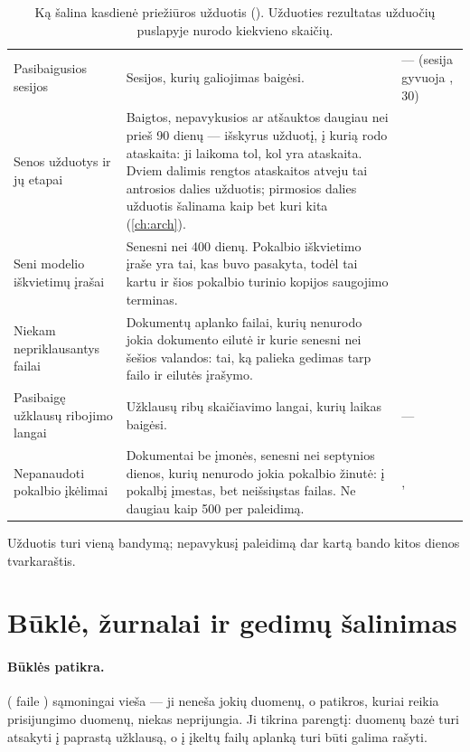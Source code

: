 \begin{table}[H]
\caption{Ką šalina kasdienė priežiūros užduotis (). Užduoties
rezultatas užduočių puslapyje nurodo kiekvieno skaičių.}\label{tab:ops:maintenance}
\begin{tabularx}{\textwidth}{@{}L{38mm}YL{45mm}@{}}
\toprule
{} &  &  \\
\midrule
Pasibaigusios sesijos & Sesijos, kurių galiojimas baigėsi. & --- (sesija gyvuoja , 30) \\
Senos užduotys ir jų etapai & Baigtos, nepavykusios ar atšauktos daugiau nei prieš 90 dienų --- išskyrus užduotį, į kurią rodo ataskaita: ji laikoma tol, kol yra ataskaita. Dviem dalimis rengtos ataskaitos atveju tai antrosios dalies užduotis; pirmosios dalies užduotis šalinama kaip bet kuri kita (\cref{ch:arch}). &  \\
Seni modelio iškvietimų įrašai & Senesni nei 400 dienų. Pokalbio iškvietimo įraše yra tai, kas buvo pasakyta, todėl tai kartu ir šios pokalbio turinio kopijos saugojimo terminas. &  \\
Niekam nepriklausantys failai &Dokumentų aplanko failai, kurių nenurodo jokia dokumento eilutė ir kurie senesni nei šešios valandos: tai, ką palieka gedimas tarp failo ir eilutės įrašymo. &  \\
Pasibaigę užklausų ribojimo langai & Užklausų ribų skaičiavimo langai, kurių laikas baigėsi. & --- \\
Nepanaudoti pokalbio įkėlimai & Dokumentai be įmonės, senesni nei septynios dienos, kurių nenurodo jokia pokalbio žinutė: į pokalbį įmestas, bet neišsiųstas failas. Ne daugiau kaip 500 per paleidimą. & ,  \\
\bottomrule
\end{tabularx}
\end{table}

Užduotis turi vieną bandymą; nepavykusį paleidimą dar kartą bando kitos dienos tvarkaraštis.


\section{Būklė, žurnalai ir gedimų šalinimas}\label{sec:ops:health}

\paragraph{Būklės patikra.}  ( faile )
sąmoningai vieša --- ji neneša jokių duomenų, o patikros, kuriai reikia prisijungimo duomenų,
niekas neprijungia. Ji tikrina parengtį: duomenų bazė turi atsakyti į paprastą užklausą, o į
įkeltų failų aplanką turi būti galima rašyti.

